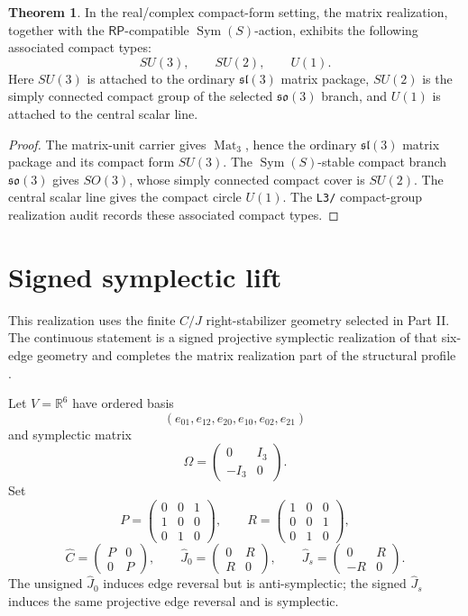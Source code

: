 \documentclass[11pt]{article}
\theoremstyle{definition}
\newtheorem{theorem}{Theorem}[section]
\newcommand{\RP}{\mathsf{RP}}
\begin{document}
\begin{theorem}
\label{thm:19.1}
In the real/complex compact-form setting, the matrix realization, together with
the \(\RP\)-compatible \(\operatorname{Sym}(S)\)-action, exhibits the following
associated compact types:
\[
SU(3),
\qquad
SU(2),
\qquad
U(1).
\]
Here \(SU(3)\) is attached to the ordinary \(\mathfrak{sl}(3)\) matrix
package, \(SU(2)\) is the simply connected compact group of the selected
\(\mathfrak{so}(3)\) branch, and \(U(1)\) is attached to the central scalar
line.
\end{theorem}

\begin{proof}
The matrix-unit carrier gives \(\operatorname{Mat}_3\), hence the ordinary
\(\mathfrak{sl}(3)\) matrix package and its compact form \(SU(3)\).  The
\(\operatorname{Sym}(S)\)-stable compact branch \(\mathfrak{so}(3)\) gives
\(SO(3)\), whose simply connected compact cover is \(SU(2)\).  The central
scalar line gives the compact circle \(U(1)\).  The \texttt{L3/}
compact-group realization audit records these associated compact types.
\end{proof}

\section{Signed symplectic lift}\label{signed-symplectic-lift}\label{signed-symplectic-realization}

This realization uses the finite \(C/J\) right-stabilizer geometry selected in
Part II.  The continuous statement is a signed projective symplectic
realization of that six-edge geometry and completes the matrix realization
part of the structural profile \cite{McDuffSalamon2017}.

Let \(V=\mathbb R^6\) have ordered basis
\[
(e_{01},e_{12},e_{20},e_{10},e_{02},e_{21})
\]
and symplectic matrix
\[
\Omega=
\begin{pmatrix}0&I_3\\-I_3&0\end{pmatrix}.
\]
Set
\[
P=\begin{pmatrix}0&0&1\\1&0&0\\0&1&0\end{pmatrix},
\qquad
R=\begin{pmatrix}1&0&0\\0&0&1\\0&1&0\end{pmatrix},
\]
\[
\widehat C=\begin{pmatrix}P&0\\0&P\end{pmatrix},
\qquad
\widehat J_0=\begin{pmatrix}0&R\\R&0\end{pmatrix},
\qquad
\widehat J_s=\begin{pmatrix}0&R\\-R&0\end{pmatrix}.
\]
The unsigned \(\widehat J_0\) induces edge reversal but is anti-symplectic;
the signed \(\widehat J_s\) induces the same projective edge reversal and is
symplectic.
\end{document}

